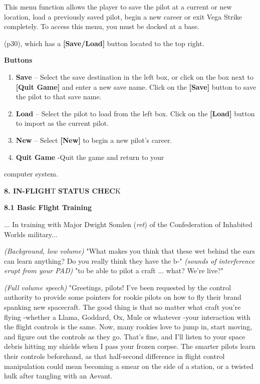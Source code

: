 \documentclass{article}
\begin{document}
This menu function allows the player to save the pilot at a current or new location, load a previously saved pilot, begin a new career or exit Vega Strike completely.  To access this menu, you must be docked at a base. 

(p30), which has a \textbf{[Save/Load] }button located to the top right. 

\textbf{Buttons }

\begin{enumerate}
\item \textbf{ Save }-- Select the save destination in the left box, or click on the box next to \textbf{[Quit Game] }and enter a new save name. Click on the \textbf{[Save] }button to save the pilot to that save name. 

\item  \textbf{Load }-- Select the pilot to load from the left box. Click on the \textbf{[Load] }button to import as the current pilot. 

\item  \textbf{New} -- Select \textbf{[New]} to begin a new pilot's career. 

\item  \textbf{Quit Game }-Quit the game and return to your 
\end{enumerate}





computer system. 



\eject 

\textbf{8. IN-FLIGH}T \textbf{STATUS CHEC}K





\textbf{8.1 Basic Flight Training }

... In training with Major Dwight Somlen (\textit{ret}) of the Confederation of Inhabited Worlds military... 

\textit{(Background, low volume) }"What makes you think that these wet behind the ears can learn anything? Do you really think they have the b-" \textit{(sounds of interference erupt from your PAD) }"to be able to pilot a craft ... what? We're live?" 

\textit{(Full volume speech) }"Greetings, pilots! I've been requested by the control authority to provide some pointers for rookie pilots on how to fly their brand spanking new spacecraft. The good thing is that no matter what craft you're flying -whether a Llama, Goddard, Ox, Mule or whatever -your interaction with the flight controls is the same. Now, many rookies love to jump in, start moving, and figure out the controls as they go. That's fine, and I'll listen to your space debris hitting my shields when I pass your frozen corpse. The smarter pilots learn their controls beforehand, as that half-second difference in flight control manipulation could mean becoming a smear on the side of a station, or a twisted hulk after tangling with an Aevant. 
\end{document}
